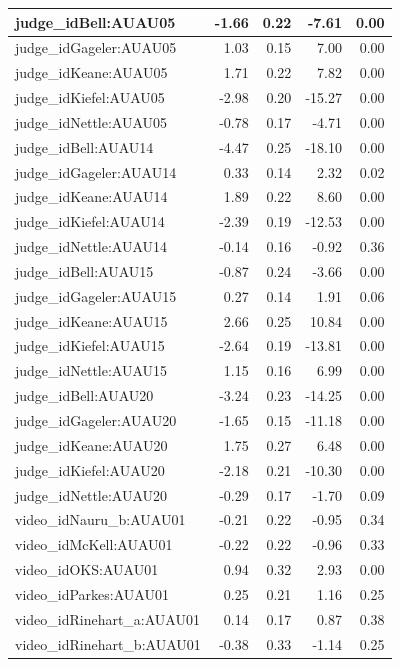 \documentclass{monashthesis}
\begin{document}
\begin{tabular}{l|r|r|r|r}
\hline
judge\_idBell:AUAU05 & -1.66 & 0.22 & -7.61 & 0.00\\
\hline
judge\_idGageler:AUAU05 & 1.03 & 0.15 & 7.00 & 0.00\\
\hline
judge\_idKeane:AUAU05 & 1.71 & 0.22 & 7.82 & 0.00\\
\hline
judge\_idKiefel:AUAU05 & -2.98 & 0.20 & -15.27 & 0.00\\
\hline
judge\_idNettle:AUAU05 & -0.78 & 0.17 & -4.71 & 0.00\\
\hline
judge\_idBell:AUAU14 & -4.47 & 0.25 & -18.10 & 0.00\\
\hline
judge\_idGageler:AUAU14 & 0.33 & 0.14 & 2.32 & 0.02\\
\hline
judge\_idKeane:AUAU14 & 1.89 & 0.22 & 8.60 & 0.00\\
\hline
judge\_idKiefel:AUAU14 & -2.39 & 0.19 & -12.53 & 0.00\\
\hline
judge\_idNettle:AUAU14 & -0.14 & 0.16 & -0.92 & 0.36\\
\hline
judge\_idBell:AUAU15 & -0.87 & 0.24 & -3.66 & 0.00\\
\hline
judge\_idGageler:AUAU15 & 0.27 & 0.14 & 1.91 & 0.06\\
\hline
judge\_idKeane:AUAU15 & 2.66 & 0.25 & 10.84 & 0.00\\
\hline
judge\_idKiefel:AUAU15 & -2.64 & 0.19 & -13.81 & 0.00\\
\hline
judge\_idNettle:AUAU15 & 1.15 & 0.16 & 6.99 & 0.00\\
\hline
judge\_idBell:AUAU20 & -3.24 & 0.23 & -14.25 & 0.00\\
\hline
judge\_idGageler:AUAU20 & -1.65 & 0.15 & -11.18 & 0.00\\
\hline
judge\_idKeane:AUAU20 & 1.75 & 0.27 & 6.48 & 0.00\\
\hline
judge\_idKiefel:AUAU20 & -2.18 & 0.21 & -10.30 & 0.00\\
\hline
judge\_idNettle:AUAU20 & -0.29 & 0.17 & -1.70 & 0.09\\
\hline
video\_idNauru\_b:AUAU01 & -0.21 & 0.22 & -0.95 & 0.34\\
\hline
video\_idMcKell:AUAU01 & -0.22 & 0.22 & -0.96 & 0.33\\
\hline
video\_idOKS:AUAU01 & 0.94 & 0.32 & 2.93 & 0.00\\
\hline
video\_idParkes:AUAU01 & 0.25 & 0.21 & 1.16 & 0.25\\
\hline
video\_idRinehart\_a:AUAU01 & 0.14 & 0.17 & 0.87 & 0.38\\
\hline
video\_idRinehart\_b:AUAU01 & -0.38 & 0.33 & -1.14 & 0.25\\

\end{tabular}
\end{document}
